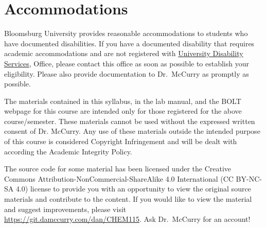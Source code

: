 \documentclass[11pt,letterpaper]{article}
\begin{document}
\section{Accommodations}
Bloomsburg University provides reasonable accommodations to students who have
documented disabilities. If you have a documented disability that requires
academic accommodations and are not registered with 
\href{https://intranet.bloomu.edu/disabilities}{University Disability Services},
Office, please contact this office as soon as possible to establish your
eligibility. Please also provide documentation to Dr.\ McCurry as promptly as
possible.

%

\vfill

\begin{mdframed}
	\noindent
	The materials contained in this syllabus, in the lab manual, and the
	BOLT webpage for this course are intended only for those registered for
	the above course/semester. These materials cannot be used without the
	expressed written consent of Dr. McCurry. Any use of these materials
	outside the intended purpose of this course is considered Copyright
	Infringement and will be dealt with according the Academic Integrity
	Policy.  

	\noindent
	The source code for some material has been licensed under the Creative
	Commons Attribution-NonCommercial-ShareAlike 4.0 International (CC
	BY-NC-SA 4.0) license to provide you with an opportunity to view the
	original source materials and contribute to the content. If you would
	like to view the material and suggest improvements, please visit
	\url{https://git.damccurry.com/dan/CHEM115}. Ask Dr.\ McCurry for an
	account!
\end{mdframed}
\end{document}
